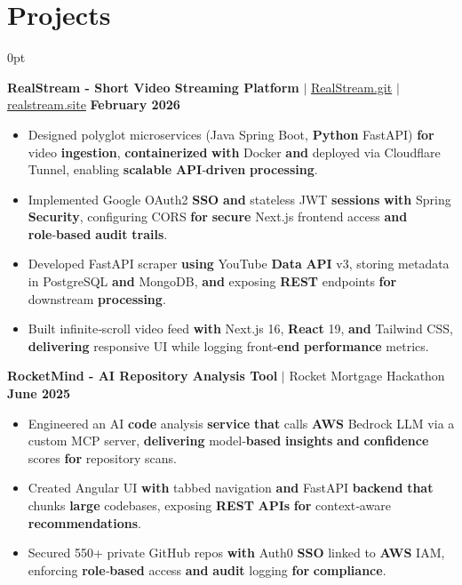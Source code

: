 \documentclass[letterpaper,10pt]{article}
\newlength{\contentindent}
\newcommand{\sectioncontent}[1]{%
  \begin{adjustwidth}{\contentindent}{0pt}%
  #1%
  \end{adjustwidth}%
}
\begin{document}
\section{Projects}
\sectioncontent{

\textbf{RealStream - Short Video Streaming Platform} $|$ \href{https://github.com/Saurav-Kalaskar/RealStream.git}{RealStream.git} $|$ \href{https://realstream.site/}{realstream.site} \hfill \textbf{February 2026}
\begin{itemize}
    \item Designed polyglot microservices (Java Spring Boot, \textbf{Python} FastAPI) \textbf{for} video \textbf{ingestion}, \textbf{containerized} \textbf{with} Docker \textbf{and} deployed via Cloudflare Tunnel, enabling \textbf{scalable} \textbf{API}‑\textbf{driven} \textbf{processing}.
    \item Implemented Google OAuth2 \textbf{SSO} \textbf{and} stateless JWT \textbf{sessions} \textbf{with} Spring \textbf{Security}, configuring CORS \textbf{for} \textbf{secure} Next.js frontend access \textbf{and} \textbf{role}‑\textbf{based} \textbf{audit} \textbf{trails}.
    \item Developed FastAPI scraper \textbf{using} YouTube \textbf{Data} \textbf{API} v3, storing metadata in PostgreSQL \textbf{and} MongoDB, \textbf{and} exposing \textbf{REST} endpoints \textbf{for} downstream \textbf{processing}.
    \item Built infinite‑scroll video feed \textbf{with} Next.js 16, \textbf{React} 19, \textbf{and} Tailwind CSS, \textbf{delivering} responsive UI while logging front‑\textbf{end} \textbf{performance} metrics.
\end{itemize}

\textbf{RocketMind - AI Repository Analysis Tool} $|$ Rocket Mortgage Hackathon \hfill \textbf{June 2025}
\begin{itemize}
    \item Engineered an AI \textbf{code} analysis \textbf{service} \textbf{that} calls \textbf{AWS} Bedrock LLM via a custom MCP server, \textbf{delivering} model‑\textbf{based} \textbf{insights} \textbf{and} \textbf{confidence} scores \textbf{for} repository scans.
    \item Created Angular UI \textbf{with} tabbed navigation \textbf{and} FastAPI \textbf{backend} \textbf{that} chunks \textbf{large} codebases, exposing \textbf{REST} \textbf{APIs} \textbf{for} context‑aware \textbf{recommendations}.
    \item Secured 550+ private GitHub repos \textbf{with} Auth0 \textbf{SSO} linked to \textbf{AWS} IAM, enforcing \textbf{role}‑\textbf{based} access \textbf{and} \textbf{audit} logging \textbf{for} \textbf{compliance}.
\end{itemize}


}
\end{document}
